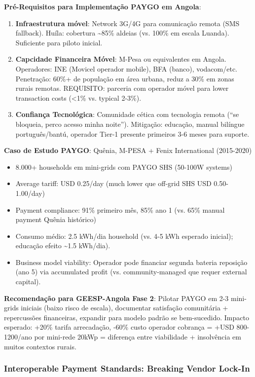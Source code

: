 \documentclass[12pt, a4paper]{article}
\begin{document}
\textbf{Pré-Requisitos para Implementação PAYGO em Angola}:
\begin{enumerate}
\item \textbf{Infraestrutura móvel}: Network 3G/4G para comunicação remota (SMS fallback). Huíla: cobertura \textasciitilde{}85\% aldeias (vs. 100\% em escala Luanda). Suficiente para piloto inicial.
\item \textbf{Capcidade Financeira Móvel}: M-Pesa ou equivalentes em Angola. Operadores: INE (Movicel operador mobile), BFA (banco), vodacom/etc. Penetração: 60\%+ de população em área urbana, reduz a 30\% em zonas rurais remotas. REQUISITO: parceria com operador móvel para lower transaction costs (<1\% vs. typical 2-3\%).
\item \textbf{Confiança Tecnológica}: Comunidade cética com tecnologia remota (``se bloqueia, perco acesso minha noite''). Mitigação: educação, manual bilíngue português/bantú, operador Tier-1 presente primeiros 3-6 meses para suporte.
\end{enumerate}

\textbf{Caso de Estudo PAYGO}: Quênia, M-PESA + Fenix International (2015-2020)
\begin{itemize}
\item 8.000+ households em mini-grids com PAYGO SHS (50-100W systems)
\item Average tariff: USD 0.25/day (much lower que off-grid SHS USD 0.50-1.00/day)
\item Payment compliance: 91\% primeiro mês, 85\% ano 1 (vs. 65\% manual payment Quênia histórico)
\item Consumo médio: 2.5 kWh/dia household (vs. 4-5 kWh esperado inicial); educação efeito \textasciitilde{}1.5 kWh/dia).
\item Business model viability: Operador pode financiar segunda bateria reposição (ano 5) via accumulated profit (vs. community-managed que requer external capital).
\end{itemize}

\textbf{Recomendação para GEESP-Angola Fase 2}:
Pilotar PAYGO em 2-3 mini-grids iniciais (baixo risco de escala), documentar satisfação comunitária + repercussões financeiras, expandir para modelo padrão se bem-sucedido. Impacto esperado: +20\% tarifa arrecadação, -60\% custo operador cobrança = +USD 800-1200/ano por mini-rede 20kWp = diferença entre viabilidade + insolvência em muitos contextos rurais.

\subsubsection{Interoperable Payment Standards: Breaking Vendor Lock-In}
\end{document}
